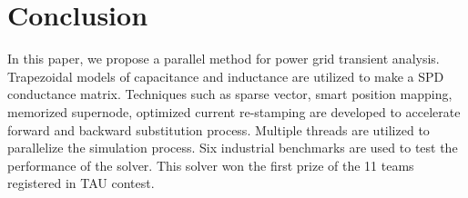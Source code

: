 \section{Conclusion}
In this paper, we propose a parallel method for power grid transient analysis. Trapezoidal models of capacitance and inductance are 
utilized to make a SPD conductance matrix. Techniques such as sparse vector, smart position mapping, memorized supernode, optimized current 
re-stamping are developed to accelerate forward and backward substitution process. Multiple threads are utilized to parallelize the
simulation process. Six industrial benchmarks are used to test the performance of the solver. This solver won the first prize of the
11 teams registered in TAU contest.